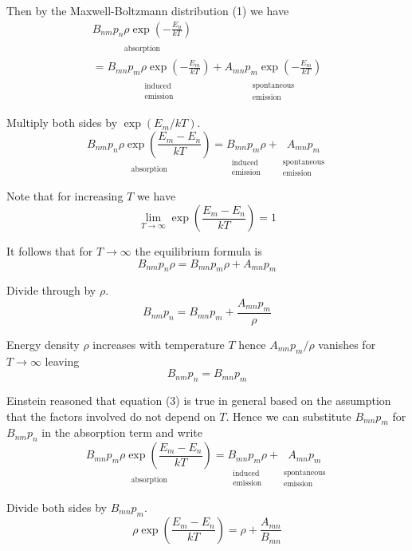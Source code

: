 \documentclass[12pt]{article}
\newcommand\BNM{B_{nm}} %
\newcommand\BMN{B_{mn}} %
\newcommand\AMN{A_{mn}} %
\newcommand\RHO{\rho}
\newcommand\ABSORPTION{\substack{\\[1ex] \text{absorption}}}
\newcommand\INDUCED{\substack{\\[1ex] \text{induced}\\ \text{emission}}}
\newcommand\SPONTANEOUS{\substack{\\[1ex] \text{spontaneous}\\ \text{emission}}}
\begin{document}
\noindent
Then by the Maxwell-Boltzmann distribution (1) we have
\begin{multline*}
\underset{\ABSORPTION}{\BNM p_n \RHO\exp\left(-\frac{E_n}{kT}\right)}
\\
=\underset{\INDUCED}{\BMN p_m \RHO\exp\left(-\frac{E_m}{kT}\right)}
+\underset{\SPONTANEOUS}{\AMN p_m\exp\left(-\frac{E_m}{kT}\right)}
\tag{2}
\end{multline*}

\noindent
Multiply both sides by $\exp(E_m/kT)$.
\begin{equation*}
\underset{\ABSORPTION}{\BNM p_n \RHO\exp\left(\frac{E_m-E_n}{kT}\right)}
=\underset{\INDUCED}{\BMN p_m \RHO}
+\underset{\SPONTANEOUS}{\AMN p_m}
\end{equation*}

\noindent
Note that for increasing $T$ we have
\begin{equation*}
\lim_{T\rightarrow\infty}\exp\left(\frac{E_m-E_n}{kT}\right)=1
\end{equation*}

\noindent
It follows that for $T\rightarrow\infty$ the equilibrium formula is
\begin{equation*}
\BNM p_n \RHO
=\BMN p_m \RHO
+\AMN p_m
\end{equation*}

\noindent
Divide through by $\RHO$.
\begin{equation*}
\BNM p_n=\BMN p_m+\frac{\AMN p_m}{\RHO}
\end{equation*}

\noindent
Energy density $\RHO$ increases with temperature $T$
hence $\AMN p_m/\RHO$ vanishes for $T\rightarrow\infty$ leaving
\begin{equation*}
\BNM p_n=\BMN p_m
\tag{3}
\end{equation*}

\noindent
Einstein reasoned that equation (3) is true in general based on the assumption that
the factors involved do not depend on $T$.
Hence we can substitute $B_{mn}p_m$ for $B_{nm}p_n$ in the absorption term and write
\begin{equation*}
\underset{\ABSORPTION}{\BMN p_m \RHO\exp\left(\frac{E_m-E_n}{kT}\right)}
=\underset{\INDUCED}{\BMN p_m \RHO}
+\underset{\SPONTANEOUS}{\AMN p_m}
\end{equation*}

\noindent
Divide both sides by $\BMN p_m$.
\begin{equation*}
\RHO\exp\left(\frac{E_m-E_n}{kT}\right)
=\RHO+\frac{\AMN}{\BMN}
\end{equation*}
\end{document}
